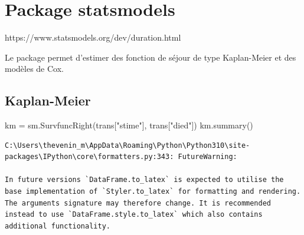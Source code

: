 \documentclass[
  12pt,
  letterpaper,
  DIV=11,
  numbers=noendperiod,
  onepage,
  openany]{scrreprt}
\newenvironment{Shaded}{\begin{snugshade}}{\end{snugshade}}
\newcommand{\NormalTok}[1]{\textcolor[rgb]{0.80,0.80,0.80}{#1}}
\newcommand{\OperatorTok}[1]{\textcolor[rgb]{0.94,0.94,0.82}{#1}}
\newcommand{\StringTok}[1]{\textcolor[rgb]{0.80,0.58,0.58}{#1}}
\begin{document}
\hypertarget{package-statsmodels}{%
\chapter{Package statsmodels}\label{package-statsmodels}}

https://www.statsmodels.org/dev/duration.html

Le package permet d'estimer des fonction de séjour de type Kaplan-Meier
et des modèles de Cox.

\hypertarget{kaplan-meier}{%
\section{Kaplan-Meier}\label{kaplan-meier}}

\begin{Shaded}
\begin{Highlighting}[]
\NormalTok{km }\OperatorTok{=}\NormalTok{ sm.SurvfuncRight(trans[}\StringTok{"stime"}\NormalTok{], trans[}\StringTok{"died"}\NormalTok{])}
\NormalTok{km.summary()}
\end{Highlighting}
\end{Shaded}

\begin{verbatim}
C:\Users\thevenin_m\AppData\Roaming\Python\Python310\site-packages\IPython\core\formatters.py:343: FutureWarning:

In future versions `DataFrame.to_latex` is expected to utilise the base implementation of `Styler.to_latex` for formatting and rendering. The arguments signature may therefore change. It is recommended instead to use `DataFrame.style.to_latex` which also contains additional functionality.
\end{verbatim}
\end{document}
